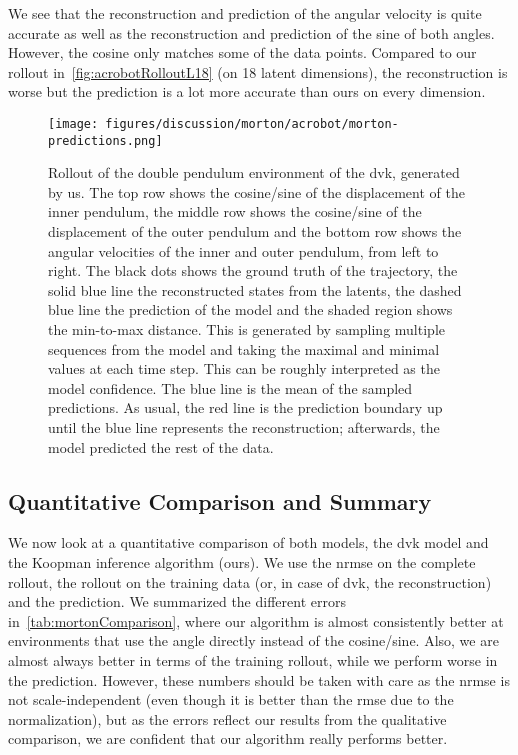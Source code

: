 		We see that the reconstruction and prediction of the angular velocity is quite accurate as well as the reconstruction and prediction of the sine of both angles. However, the cosine only matches some of the data points. Compared to our rollout in~\autoref{fig:acrobotRolloutL18} (on 18 latent dimensions), the reconstruction is worse but the prediction is a lot more accurate than ours on every dimension.

		\begin{figure}
			\centering
			\texttt{[image: figures/discussion/morton/acrobot/morton-predictions.png]}
			\caption[Rollout of the double pendulum environment of the \ac{dvk} model]{Rollout of the double pendulum environment of the \ac{dvk}, generated by us. The top row shows the cosine/sine of the displacement of the inner pendulum, the middle row shows the cosine/sine of the displacement of the outer pendulum and the bottom row shows the angular velocities of the inner and outer pendulum, from left to right. The black dots shows the ground truth of the trajectory, the solid blue line the reconstructed states from the latents, the dashed blue line the prediction of the model and the shaded region shows the min-to-max distance. This is generated by sampling multiple sequences from the model and taking the maximal and minimal values at each time step. This can be roughly interpreted as the model confidence. The blue line is the mean of the sampled predictions. As usual, the red line is the prediction boundary up until the blue line represents the reconstruction; afterwards, the model predicted the rest of the data.}
			\label{fig:mortonAcrobot}
		\end{figure}

	\subsection{Quantitative Comparison and Summary}
		We now look at a quantitative comparison of both models, the \ac{dvk} model and the Koopman inference algorithm (ours). We use the \ac{nrmse} on the complete rollout, the rollout on the training data (or, in case of \ac{dvk}, the reconstruction) and the prediction. We summarized the different errors in~\autoref{tab:mortonComparison}, where our algorithm is almost consistently better at environments that use the angle directly instead of the cosine/sine. Also, we are almost always better in terms of the training rollout, while we perform worse in the prediction. However, these numbers should be taken with care as the \ac{nrmse} is not scale-independent (even though it is better than the \ac{rmse} due to the normalization), but as the errors reflect our results from the qualitative comparison, we are confident that our algorithm really performs better.

